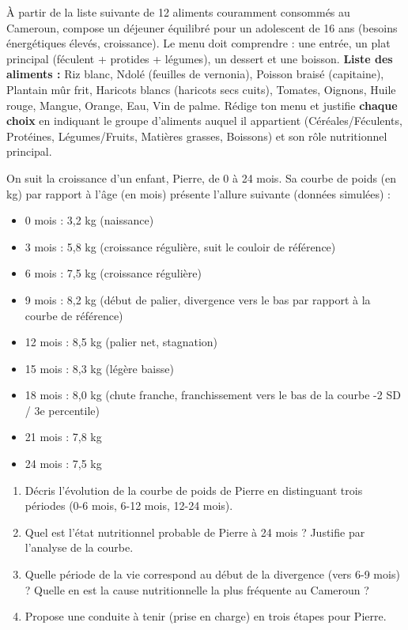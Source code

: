\documentclass[11pt]{article}
\begin{document}
\begin{exercice}
À partir de la liste suivante de 12 aliments couramment consommés au Cameroun, compose un déjeuner équilibré pour un adolescent de 16 ans (besoins énergétiques élevés, croissance). Le menu doit comprendre : une entrée, un plat principal (féculent + protides + légumes), un dessert et une boisson.
\medskip
\textbf{Liste des aliments :} Riz blanc, Ndolé (feuilles de vernonia), Poisson braisé (capitaine), Plantain mûr frit, Haricots blancs (haricots secs cuits), Tomates, Oignons, Huile rouge, Mangue, Orange, Eau, Vin de palme.
\medskip
Rédige ton menu et justifie \textbf{chaque choix} en indiquant le groupe d'aliments auquel il appartient (Céréales/Féculents, Protéines, Légumes/Fruits, Matières grasses, Boissons) et son rôle nutritionnel principal.
\end{exercice}

\begin{exercice}
On suit la croissance d'un enfant, Pierre, de 0 à 24 mois. Sa courbe de poids (en kg) par rapport à l'âge (en mois) présente l'allure suivante (données simulées) :
\begin{itemize}
    \item 0 mois : 3,2 kg (naissance)
    \item 3 mois : 5,8 kg (croissance régulière, suit le couloir de référence)
    \item 6 mois : 7,5 kg (croissance régulière)
    \item 9 mois : 8,2 kg (début de palier, divergence vers le bas par rapport à la courbe de référence)
    \item 12 mois : 8,5 kg (palier net, stagnation)
    \item 15 mois : 8,3 kg (légère baisse)
    \item 18 mois : 8,0 kg (chute franche, franchissement vers le bas de la courbe -2 SD / 3e percentile)
    \item 21 mois : 7,8 kg
    \item 24 mois : 7,5 kg
\end{itemize}
\begin{enumerate}
    \item Décris l'évolution de la courbe de poids de Pierre en distinguant trois périodes (0-6 mois, 6-12 mois, 12-24 mois).
    \item Quel est l'état nutritionnel probable de Pierre à 24 mois ? Justifie par l'analyse de la courbe.
    \item Quelle période de la vie correspond au début de la divergence (vers 6-9 mois) ? Quelle en est la cause nutritionnelle la plus fréquente au Cameroun ?
    \item Propose une conduite à tenir (prise en charge) en trois étapes pour Pierre.
\end{enumerate}
\end{exercice}
\end{document}
